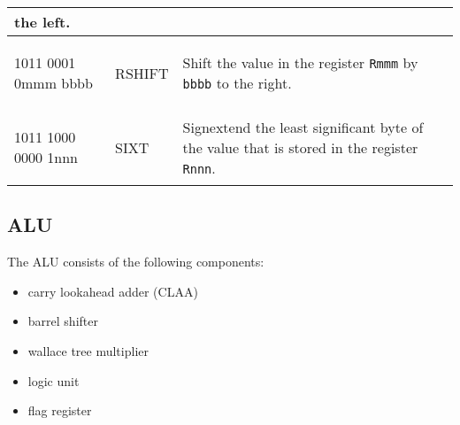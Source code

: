 \documentclass{report}
\newcommand{\boxchar}[1]{\begin{boxednumbers} #1
\end{boxednumbers}}
\begin{document}
\begin{center}
\begin{longtable}{m{}m{}m{}}
                                                    the left.\\
                                                    \hline
        \boxchar{1011 0001 0mmm bbbb} & RSHIFT    & Shift the value in the register
                                                    \texttt{Rmmm} by \texttt{bbbb} to
                                                    the right.\\
                                                    \hline
        \boxchar{1011 1000 0000 1nnn} & SIXT      & Signextend the least significant
                                                    byte of the value that is stored
                                                    in the register \texttt{Rnnn}.\\
                                                    \hline
    \end{longtable}
\end{center}
\subsection*{ALU}
The ALU consists of the following components:
\begin{itemize}
    \item carry lookahead adder (CLAA)
    \item barrel shifter
    \item wallace tree multiplier
    \item logic unit
    \item flag register
\end{itemize}

\end{document}

